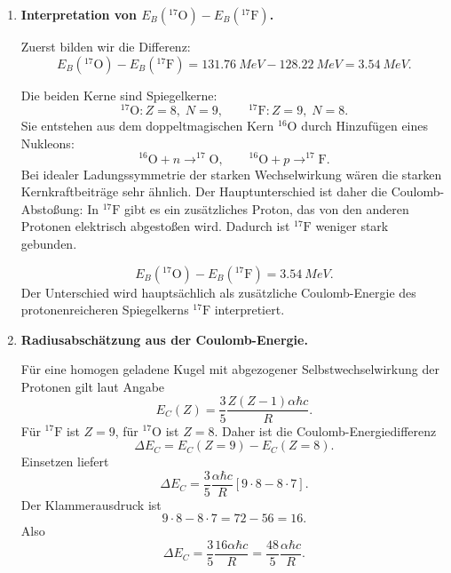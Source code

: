 \documentclass[11pt,a4paper]{scrartcl}
\newcommand{\bracket}[1]{\left[ #1 \right]}
\newcommand{\isotope}[2]{^{#1}\mathrm{#2}}
\theoremstyle{definition}
\theoremstyle{plain}
\theoremstyle{remark}
\begin{document}
\begin{enumerate}[label=(\alph*)]
    \begin{answerbox}
        \[
            \boxed{\Delta E(1p_{1/2}\to 1d_{5/2})\approx \SI{11.52}{MeV}}.
        \]
    \end{answerbox}

    \item \textbf{Interpretation von $E_B(\isotope{17}{O})-E_B(\isotope{17}{F})$.}

    \begin{calculationbox}
        Zuerst bilden wir die Differenz:
        \[
            E_B(\isotope{17}{O})-E_B(\isotope{17}{F})
            =\SI{131.76}{MeV}-\SI{128.22}{MeV}
            =\SI{3.54}{MeV}.
        \]
    \end{calculationbox}

    \begin{solutionbox}
        Die beiden Kerne sind Spiegelkerne:
        \[
            \isotope{17}{O}: Z=8,\;N=9,
            \qquad
            \isotope{17}{F}: Z=9,\;N=8.
        \]
        Sie entstehen aus dem doppeltmagischen Kern $\isotope{16}{O}$ durch Hinzuf\"ugen eines Nukleons:
        \[
            \isotope{16}{O}+n\to\isotope{17}{O},
            \qquad
            \isotope{16}{O}+p\to\isotope{17}{F}.
        \]
        Bei idealer Ladungssymmetrie der starken Wechselwirkung w\"aren die starken Kernkraftbeitr\"age sehr \"ahnlich. Der Hauptunterschied ist daher die Coulomb-Absto\ss{}ung: In $\isotope{17}{F}$ gibt es ein zus\"atzliches Proton, das von den anderen Protonen elektrisch abgesto\ss{}en wird. Dadurch ist $\isotope{17}{F}$ weniger stark gebunden.
    \end{solutionbox}

    \begin{answerbox}
        \[
            \boxed{E_B(\isotope{17}{O})-E_B(\isotope{17}{F})=\SI{3.54}{MeV}}.
        \]
        Der Unterschied wird haupts\"achlich als zus\"atzliche Coulomb-Energie des protonenreicheren Spiegelkerns $\isotope{17}{F}$ interpretiert.
    \end{answerbox}

    \item \textbf{Radiusabsch\"atzung aus der Coulomb-Energie.}

    \begin{calculationbox}
        F\"ur eine homogen geladene Kugel mit abgezogener Selbstwechselwirkung der Protonen gilt laut Angabe
        \[
            E_C(Z)=\frac{3}{5}\frac{Z(Z-1)\alpha\hbar c}{R}.
        \]
        F\"ur $\isotope{17}{F}$ ist $Z=9$, f\"ur $\isotope{17}{O}$ ist $Z=8$. Daher ist die Coulomb-Energiedifferenz
        \[
            \Delta E_C
            =E_C(Z=9)-E_C(Z=8).
        \]
        Einsetzen liefert
        \[
            \Delta E_C
            =\frac{3}{5}\frac{\alpha\hbar c}{R}
            \bracket{9\cdot 8-8\cdot 7}.
        \]
        Der Klammerausdruck ist
        \[
            9\cdot 8-8\cdot 7=72-56=16.
        \]
        Also
        \[
            \Delta E_C
            =\frac{3}{5}\frac{16\alpha\hbar c}{R}
            =\frac{48}{5}\frac{\alpha\hbar c}{R}.
        \]
    \end{calculationbox}


\end{enumerate}
\end{document}
